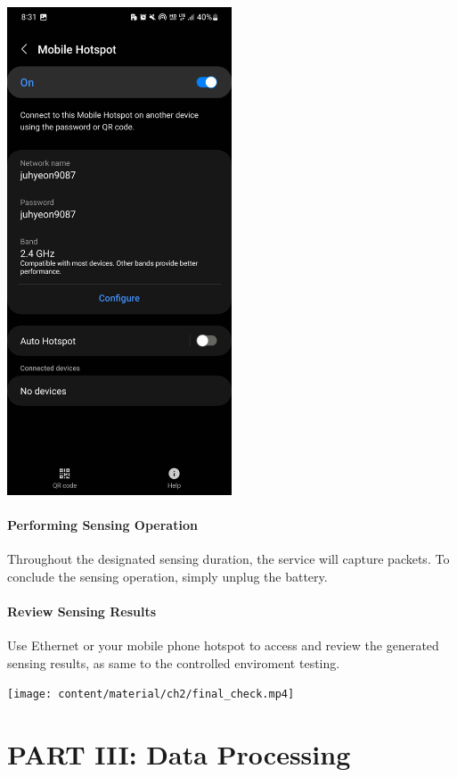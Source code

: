 \documentclass[
  letterpaper,
]{scrbook}
\begin{document}
\includegraphics[width=0.5\textwidth,height=\textheight]{content/material/ch2/check_hotspot_off.jpg}

\subsection{Performing Sensing
Operation}\label{performing-sensing-operation}

Throughout the designated sensing duration, the service will capture
packets. To conclude the sensing operation, simply unplug the battery.

\subsection{Review Sensing Results}\label{review-sensing-results}

Use Ethernet or your mobile phone hotspot to access and review the
generated sensing results, as same to the controlled enviroment testing.

\texttt{[image: content/material/ch2/final\_check.mp4]}

\part{PART III: Data Processing}
\end{document}
